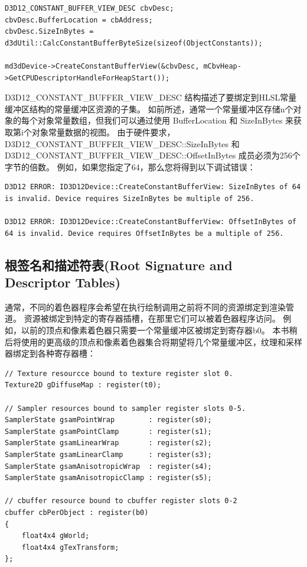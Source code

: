 \documentclass[11pt,a4paper,oldfontcommands]{memoir}
\begin{document}
{\begin{flushleft}
\begin{lstlisting}
D3D12_CONSTANT_BUFFER_VIEW_DESC cbvDesc;
cbvDesc.BufferLocation = cbAddress;
cbvDesc.SizeInBytes = d3dUtil::CalcConstantBufferByteSize(sizeof(ObjectConstants));

md3dDevice->CreateConstantBufferView(&cbvDesc, mCbvHeap->GetCPUDescriptorHandleForHeapStart());
\end{lstlisting}
D3D12\_CONSTANT\_BUFFER\_VIEW\_DESC 结构描述了要绑定到HLSL常量缓冲区结构的常量缓冲区资源的子集。 如前所述，通常一个常量缓冲区存储n个对象的每个对象常量数组，但我们可以通过使用 BufferLocation 和 SizeInBytes 来获取第i个对象常量数据的视图。 由于硬件要求，D3D12\_CONSTANT\_BUFFER\_VIEW\_DESC::SizeInBytes 和D3D12\_CONSTANT\_BUFFER\_VIEW\_DESC::OffsetInBytes 成员必须为256个字节的倍数。 例如，如果您指定了64，那么您将得到以下调试错误：\\
\begin{lstlisting}
D3D12 ERROR: ID3D12Device::CreateConstantBufferView: SizeInBytes of 64 is invalid. Device requires SizeInBytes be multiple of 256.

D3D12 ERROR: ID3D12Device::CreateConstantBufferView: OffsetInBytes of 64 is invalid. Device requires OffsetInBytes be a multiple of 256.
\end{lstlisting}
\end{flushleft}

\subsection{根签名和描述符表(Root Signature and Descriptor Tables)}
\begin{flushleft}
通常，不同的着色器程序会希望在执行绘制调用之前将不同的资源绑定到渲染管道。 资源被绑定到特定的寄存器插槽，在那里它们可以被着色器程序访问。 例如，以前的顶点和像素着色器只需要一个常量缓冲区被绑定到寄存器b0。 本书稍后将使用的更高级的顶点和像素着色器集合将期望将几个常量缓冲区，纹理和采样器绑定到各种寄存器槽：\\
\begin{lstlisting}
// Texture resourcce bound to texture register slot 0.
Texture2D gDiffuseMap : register(t0);

// Sampler resources bound to sampler register slots 0-5.
SamplerState gsamPointWrap        : register(s0);
SamplerState gsamPointClamp       : register(s1);
SamplerState gsamLinearWrap       : register(s2);
SamplerState gsamLinearClamp      : register(s3);
SamplerState gsamAnisotropicWrap  : register(s4);
SamplerState gsamAnisotropicClamp : register(s5);

// cbuffer resource bound to cbuffer register slots 0-2
cbuffer cbPerObject : register(b0)
{
    float4x4 gWorld;
    float4x4 gTexTransform;
};


\end{lstlisting}
\end{flushleft}}
\end{document}
